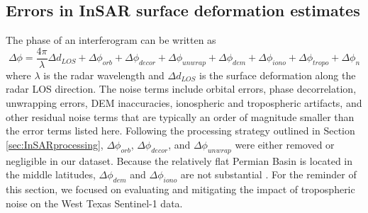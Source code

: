 \documentclass{utexasthesis}
\begin{document}
\subsection{Errors in InSAR surface deformation estimates}
\label{sec:errors} 
The phase of an interferogram can be written as \citep{Zebker1992DecorrelationInterferometricRadar, Zebker1994AccuracyTopographicMaps, Zebker1997AtmosphericEffectsInterferometric}
\begin{equation}
	\Delta \phi = \frac{4 \pi}{\lambda} \Delta d_{LOS} +  \Delta \phi_{orb} + \Delta \phi_{decor} + \Delta \phi_{unwrap}  + \Delta \phi_{dem} + \Delta \phi_{iono} + \Delta \phi_{tropo}  + \Delta \phi_{n}
\end{equation}
where $ \lambda $ is the radar wavelength and $ \Delta d_{LOS} $ is the surface deformation along the radar LOS direction. The noise terms include orbital errors, phase decorrelation, unwrapping errors, DEM inaccuracies, ionospheric and tropospheric artifacts, and other residual noise terms that are typically an order of magnitude smaller than the error terms listed here. Following the processing strategy outlined in Section \ref{sec:InSARprocessing}, $\Delta \phi_{orb}$, $\Delta \phi_{decor}$, and $\Delta \phi_{unwrap}$ were either removed or negligible in our dataset. Because the relatively flat Permian Basin is located in the middle latitudes, $\Delta \phi_{dem}$ and $\Delta \phi_{iono}$ are not substantial \citep{Fattahi2013DemErrorCorrection, Liang2019IonosphericCorrectionInsar}. For the reminder of this section, we focused on evaluating and mitigating the impact of tropospheric noise on the West Texas Sentinel-1 data.


%
\end{document}

